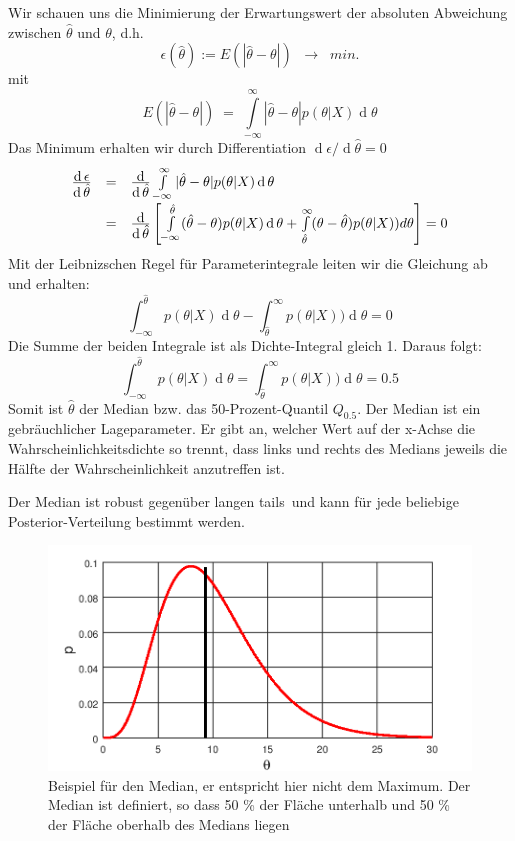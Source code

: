Wir schauen uns die Minimierung der Erwartungswert der absoluten Abweichung zwischen
$\hat{\theta}$ und $\theta$, d.h.
\[
\epsilon(\hat{\theta}) := E(|\hat{\theta}-\theta|)
\;\; \rightarrow \;\; min.
\]
mit
\[
E(|\hat{\theta}-\theta|) \; = \; \int\limits_{-\infty}^{\infty} |\hat{\theta}-\theta | p(\theta|X) \operatorname d \theta
\]
Das Minimum erhalten wir durch Differentiation $\operatorname d \epsilon / \operatorname d \hat{\theta} = 0$
\[
\begin{array}{rcl}
\frac{\textstyle \operatorname d \epsilon}{\textstyle \operatorname d \hat{\theta}} &=&
\frac{\textstyle \operatorname d}{\textstyle \operatorname d \hat{\theta}}
\int\limits_{-\infty}^{\infty} |\hat{\theta}-\theta | p(\theta|X) \operatorname d \theta \\[2ex]
&=&\frac{\textstyle \operatorname d}{\textstyle \operatorname d \hat{\theta}} \left[\int\limits_{-\infty}^{\hat{\theta}}(\hat{\theta}-\theta) p(\theta |X) \operatorname d \theta
+\int\limits_{\hat{\theta}}^{\infty} (\theta -\hat{\theta}) p(\theta|X))d \theta
\right] = 0
\end{array}
\]
Mit der Leibnizschen Regel für Parameterintegrale leiten wir die Gleichung
ab und erhalten:
\[
\int_{-\infty}^{\hat{\theta}} p(\theta |X) \operatorname d \theta
- \int_{\hat{\theta}}^{\infty} p(\theta|X)) \operatorname d \theta
= 0
\]
Die Summe der beiden Integrale ist als Dichte-Integral gleich 1.
Daraus folgt:
\[
\int_{-\infty}^{\hat{\theta}} p(\theta |X) \operatorname d \theta
= \int_{\hat{\theta}}^{\infty} p(\theta|X)) \operatorname d \theta
= 0.5
\]
Somit ist $\hat{\theta}$ der Median bzw. das 50-Prozent-Quantil $Q_{0.5}$.
Der Median ist ein gebräuchlicher Lageparameter. Er gibt an, welcher Wert auf der x-Achse die Wahrscheinlichkeitsdichte so trennt, dass links und rechts des Medians jeweils die Hälfte der Wahrscheinlichkeit anzutreffen ist.

Der Median ist robust gegenüber langen \glqq tails\grqq~und kann für
jede beliebige Posterior-Verteilung bestimmt werden.

\begin{figure}[!htb]
	\begin{center}
	  \includegraphics[width=120mm]
		{12_vorlesung_GUMS2/media/Plot_Median.png}
		\caption{Beispiel für den Median, er entspricht hier nicht dem
			Maximum. Der Median ist definiert, so dass 50 \% der Fläche unterhalb und 50 \%
		der Fläche oberhalb des Medians liegen}
	\label{fig:Median}
	\end{center}
\end{figure}

